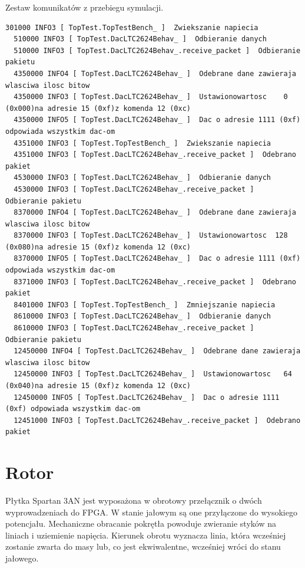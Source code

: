 \documentclass[a4paper,12pt]{article}
\begin{document}
Zestaw komunikatów z przebiegu symulacji.
\begin{lstlisting}[label=dacout,caption=DAC logi]
  301000 INFO3 [ TopTest.TopTestBench_ ]  Zwiekszanie napiecia
  510000 INFO3 [ TopTest.DacLTC2624Behav_ ]  Odbieranie danych
  510000 INFO3 [ TopTest.DacLTC2624Behav_.receive_packet ]  Odbieranie pakietu
  4350000 INFO4 [ TopTest.DacLTC2624Behav_ ]  Odebrane dane zawieraja wlasciwa ilosc bitow
  4350000 INFO3 [ TopTest.DacLTC2624Behav_ ]  Ustawionowartosc    0 (0x000)na adresie 15 (0xf)z komenda 12 (0xc)
  4350000 INFO5 [ TopTest.DacLTC2624Behav_ ]  Dac o adresie 1111 (0xf) odpowiada wszystkim dac-om
  4351000 INFO3 [ TopTest.TopTestBench_ ]  Zwiekszanie napiecia
  4351000 INFO3 [ TopTest.DacLTC2624Behav_.receive_packet ]  Odebrano pakiet
  4530000 INFO3 [ TopTest.DacLTC2624Behav_ ]  Odbieranie danych
  4530000 INFO3 [ TopTest.DacLTC2624Behav_.receive_packet ]  Odbieranie pakietu
  8370000 INFO4 [ TopTest.DacLTC2624Behav_ ]  Odebrane dane zawieraja wlasciwa ilosc bitow
  8370000 INFO3 [ TopTest.DacLTC2624Behav_ ]  Ustawionowartosc  128 (0x080)na adresie 15 (0xf)z komenda 12 (0xc)
  8370000 INFO5 [ TopTest.DacLTC2624Behav_ ]  Dac o adresie 1111 (0xf) odpowiada wszystkim dac-om
  8371000 INFO3 [ TopTest.DacLTC2624Behav_.receive_packet ]  Odebrano pakiet
  8401000 INFO3 [ TopTest.TopTestBench_ ]  Zmniejszanie napiecia
  8610000 INFO3 [ TopTest.DacLTC2624Behav_ ]  Odbieranie danych
  8610000 INFO3 [ TopTest.DacLTC2624Behav_.receive_packet ]  Odbieranie pakietu
  12450000 INFO4 [ TopTest.DacLTC2624Behav_ ]  Odebrane dane zawieraja wlasciwa ilosc bitow
  12450000 INFO3 [ TopTest.DacLTC2624Behav_ ]  Ustawionowartosc   64 (0x040)na adresie 15 (0xf)z komenda 12 (0xc)
  12450000 INFO5 [ TopTest.DacLTC2624Behav_ ]  Dac o adresie 1111 (0xf) odpowiada wszystkim dac-om
  12451000 INFO3 [ TopTest.DacLTC2624Behav_.receive_packet ]  Odebrano pakiet
\end{lstlisting}


\newpage
\section{Rotor}

Płytka Spartan 3AN jest wyposażona w obrotowy przełącznik o dwóch wyprowadzeniach do FPGA. W stanie jałowym są one przyłączone do wysokiego potencjału. Mechaniczne obracanie pokrętła powoduje zwieranie styków na liniach i uziemienie napięcia. Kierunek obrotu wyznacza linia, która wcześniej zostanie zwarta do masy lub, co jest ekwiwalentne, wcześniej wróci do stanu jałowego.
\end{document}
